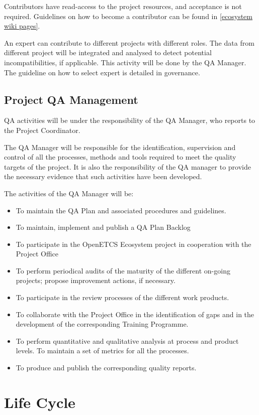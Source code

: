 \documentclass{template/openetcs_article}
\begin{document}
Contributors have read-access to the project resources, and acceptance is not required. Guidelines on how to become a contributor can be found in \href{https://github.com/openETCS/ecosystem/wiki/_pages}{[ecosystem wiki pages]}.

An expert can contribute to different projects with different roles. The data from different project will be integrated and analysed to detect potential incompatibilities, if applicable. This activity will be done by the QA Manager. The guideline on how to select expert is detailed in governance.


\subsection{Project QA Management}
QA activities will be under the responsibility of the QA Manager, who reports to the Project Coordinator.

The QA Manager will be responsible for the identification, supervision and control of all the processes, methods and tools required to meet the quality targets of the project. It is also the responsibility of the QA manager to provide the necessary evidence that such activities have been developed.

The activities of the QA Manager will be:
\begin{itemize}
\item To maintain the QA Plan and associated procedures and guidelines. 
\item To maintain, implement and publish a QA Plan Backlog
\item To participate in the OpenETCS Ecosystem project in cooperation with the Project Office
\item To perform periodical audits of the maturity of the different on-going projects; propose improvement actions, if necessary.
\item To participate in the review processes of the different work products.
\item To collaborate with the Project Office in the identification of gaps and in the development of the corresponding Training Programme.
\item To perform quantitative and qualitative analysis at process and product levels. To maintain a set of metrics for all the processes.
\item To produce and publish the corresponding quality reports.
\end{itemize}


\newpage
\section{Life Cycle}
\end{document}
